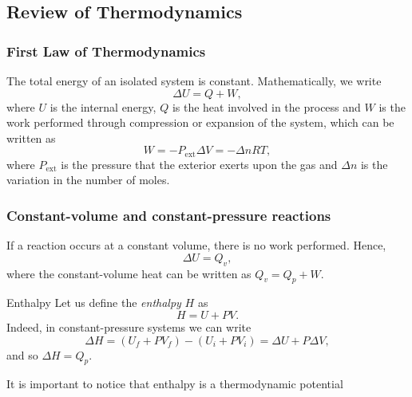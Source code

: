 \documentclass{beamer}
\begin{document}

\subsection{Review of Thermodynamics}


\begin{frame}
\frametitle{First Law of Thermodynamics}
The total energy of an isolated system is constant. Mathematically, we write
\begin{equation*}
\Delta U = Q + W,
\end{equation*}
where $U$ is the internal energy, $Q$ is the heat involved in the process and $W$ is the work performed through compression or expansion of the system, which can be written as
\begin{equation*}
W = -P_{\text{ext}}\Delta V = -\Delta nRT,
\end{equation*}
where $P_{\text{ext}}$ is the pressure that the exterior exerts upon the gas and $\Delta n$ is the variation in the number of moles.
\end{frame}


\begin{frame}
\frametitle{Constant-volume and constant-pressure reactions}
If a reaction occurs at a constant volume, there is no work performed. Hence,
\begin{equation*}
\Delta U = Q_v,
\end{equation*}
where the constant-volume heat can be written as  $ Q_v = Q_p + W$.
\begin{block}{Enthalpy}
Let us define the \textit{enthalpy} $H$ as
\begin{equation*}
H = U + PV.
\end{equation*}
Indeed, in constant-pressure systems we can write
\begin{equation*}
\Delta H = (U_f + PV_f) - (U_i + PV_i) = \Delta U + P\Delta V,
\end{equation*}
and so $\Delta H = Q_p$.
\end{block}
It is important to notice that enthalpy is a thermodynamic potential
\end{frame}

\end{document}
